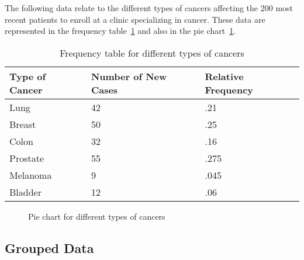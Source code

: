 \begin{example}
  The following data relate to the different types of cancers affecting the 200
  most recent patients to enroll at a clinic specializing in cancer. These data
  are represented in the frequency table~\ref{tbl:different-types-of-cancers}
  and also in the pie chart~\ref{fig:pie-chart-different-types-of-cancers}.
  \begin{table}[H]
    \centering
    \begin{tabular}{lll}
      \toprule
      Type of Cancer & Number of New Cases & Relative Frequency \\
      \midrule
      Lung           & 42                  & .21  \\
      Breast         & 50                  & .25  \\
      Colon          & 32                  & .16  \\
      Prostate       & 55                  & .275 \\
      Melanoma       & 9                   & .045 \\
      Bladder        & 12                  & .06  \\
      \bottomrule
    \end{tabular}
    \caption{Frequency table for different types of cancers}
    \label{tbl:different-types-of-cancers}
  \end{table}
  \begin{figure}[H]
    \centering
    \caption{Pie chart for different types of cancers}
    \label{fig:pie-chart-different-types-of-cancers}
  \end{figure}
\end{example}

\subsection{Grouped Data}\label{ssec:grouped-data}

